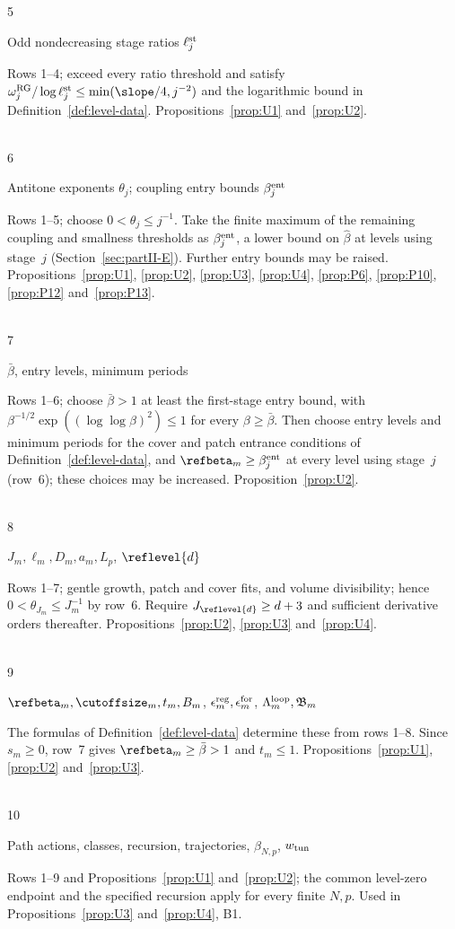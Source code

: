 \begin{tabbing}
5\>\parbox[t]{0.26\linewidth}{\raggedright Odd nondecreasing stage ratios $\ell_j^{\rm st}$}\>\parbox[t]{0.67\linewidth}{\raggedright Rows 1--4; exceed every ratio threshold and satisfy $\omega_j^{\rm RG}/\log\ell_j^{\rm st}\le\min(\slope/4,j^{-2})$ and the logarithmic bound in Definition~\ref{def:level-data}. Propositions~\ref{prop:U1} and~\ref{prop:U2}.}\\[0.45em]
6\>\parbox[t]{0.26\linewidth}{\raggedright Antitone exponents $\theta_j$; coupling entry bounds $\beta_j^{\rm ent}$}\>\parbox[t]{0.67\linewidth}{\raggedright Rows 1--5; choose $0<\theta_j\le j^{-1}$. Take the finite maximum of the remaining coupling and smallness thresholds as $\beta_j^{\rm ent}$, a lower bound on $\widehat\beta$ at levels using stage~$j$ (Section~\ref{sec:partII-E}). Further entry bounds may be raised. Propositions~\ref{prop:U1}, \ref{prop:U2}, \ref{prop:U3}, \ref{prop:U4}, \ref{prop:P6}, \ref{prop:P10}, \ref{prop:P12} and~\ref{prop:P13}.}\\[0.45em]
7\>\parbox[t]{0.26\linewidth}{\raggedright $\bar\beta$, entry levels, minimum periods}\>\parbox[t]{0.67\linewidth}{\raggedright Rows 1--6; choose $\bar\beta>1$ at least the first-stage entry bound, with $\beta^{-1/2}\exp((\log\log\beta)^2)\le1$ for every $\beta\ge\bar\beta$. Then choose entry levels and minimum periods for the cover and patch entrance conditions of Definition~\ref{def:level-data}, and $\refbeta_m\ge\beta_j^{\rm ent}$ at every level using stage~$j$ (row~6); these choices may be increased. Proposition~\ref{prop:U2}.}\\[0.45em]
8\>\parbox[t]{0.26\linewidth}{\raggedright $J_m,\ell_m,D_m,a_m,L_p$, $\reflevel{d}$}\>\parbox[t]{0.67\linewidth}{\raggedright Rows 1--7; gentle growth, patch and cover fits, and volume divisibility; hence $0<\theta_{J_m}\le J_m^{-1}$ by row~6. Require $J_{\reflevel{d}}\ge d+3$ and sufficient derivative orders thereafter. Propositions~\ref{prop:U2}, \ref{prop:U3} and~\ref{prop:U4}.}\\[0.45em]
9\>\parbox[t]{0.26\linewidth}{\raggedright $\refbeta_m,\cutoffsize_m,t_m,B_m$, $\epsilon_m^{\rm reg},\epsilon_m^{\rm for}$, $\Lambda_m^{\rm loop},\mathfrak B_m$}\>\parbox[t]{0.67\linewidth}{\raggedright The formulas of Definition~\ref{def:level-data} determine these from rows 1--8. Since $s_m\ge0$, row~7 gives $\refbeta_m\ge\bar\beta>1$ and $t_m\le1$. Propositions~\ref{prop:U1}, \ref{prop:U2} and~\ref{prop:U3}.}\\[0.45em]
10\>\parbox[t]{0.26\linewidth}{\raggedright Path actions, classes, recursion, trajectories, $\beta_{N,p}$, $w_{\rm tun}$}\>\parbox[t]{0.67\linewidth}{\raggedright Rows 1--9 and Propositions~\ref{prop:U1} and~\ref{prop:U2}; the common level-zero endpoint and the specified recursion apply for every finite $N,p$. Used in Propositions~\ref{prop:U3} and~\ref{prop:U4}, B1.}\\[0.45em]

\end{tabbing}
